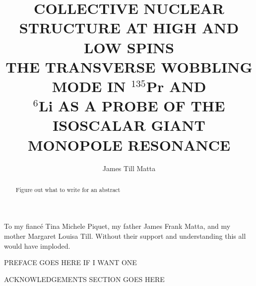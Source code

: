 \documentclass[final,numrefs,sort&compress]{nddiss2e}
\newcommand{\pr}{$^{135}$Pr}
\newcommand{\li}{$^{6}$Li}
\begin{document}
\frontmatter 
\title{COLLECTIVE NUCLEAR STRUCTURE AT HIGH AND LOW SPINS\\ THE TRANSVERSE WOBBLING MODE IN \pr{} AND \\ \li{} AS A PROBE OF THE ISOSCALAR GIANT MONOPOLE RESONANCE}
\author{James Till Matta}

\maketitle
%
%

\makecopyright

\begin{abstract}
  Figure out what to write for an abstract
\end{abstract}

\renewcommand{\dedicationname}{DEDICATED TO:}

\begin{dedication}
  To my fianc\'e Tina Michele Piquet, my father James Frank Matta, and my mother Margaret Louisa Till. Without their support and understanding this all would have imploded.
\end{dedication}

\tableofcontents
\listoffigures
\listoftables

\begin{preface}
  PREFACE GOES HERE IF I WANT ONE
\end{preface}

\begin{acknowledge}
  ACKNOWLEDGEMENTS SECTION GOES HERE
\end{acknowledge}

\begin{symbols}

\end{symbols}

\mainmatter
%
%
\end{document}
